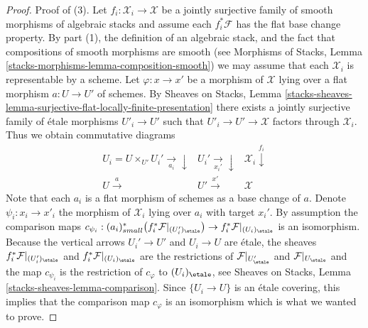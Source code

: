 \begin{proof}
\medskip\noindent
Proof of (3).
Let $f_i : \mathcal{X}_i \to \mathcal{X}$ be a jointly surjective family of
smooth morphisms of algebraic stacks and assume each $f_i^*\mathcal{F}$
has the flat base change property. By part (1), the definition of
an algebraic stack, and the fact that compositions of smooth morphisms
are smooth (see
Morphisms of Stacks, Lemma \ref{stacks-morphisms-lemma-composition-smooth})
we may assume that each $\mathcal{X}_i$ is representable by a scheme.
Let $\varphi : x \to x'$ be a morphism of $\mathcal{X}$ lying over
a flat morphism $a : U \to U'$ of schemes. By
Sheaves on Stacks, Lemma
\ref{stacks-sheaves-lemma-surjective-flat-locally-finite-presentation}
there exists a jointly surjective family of \'etale morphisms
$U'_i \to U'$ such that $U'_i \to U' \to \mathcal{X}$ factors through
$\mathcal{X}_i$. Thus we obtain commutative diagrams
$$
\begin{array}{ccc}U_i = U \times_{U'} U_i' \underset{a_i}{\longrightarrow}\downarrow & U_i' \underset{x_i'}{\longrightarrow}\downarrow & \mathcal{X}_i \overset{f_i}{\downarrow} \\ U \overset{a}{\longrightarrow} & U' \overset{x'}{\longrightarrow} & \mathcal{X}\end{array}
$$
Note that each $a_i$ is a flat morphism of schemes as a base change of $a$.
Denote $\psi_i : x_i \to x'_i$ the morphism of $\mathcal{X}_i$ lying over
$a_i$ with target $x_i'$. By assumption the comparison maps
$c_{\psi_i} :
(a_i)_{small}^*\big(f_i^*\mathcal{F}|_{(U'_i)_\etale}\big)
\to f_i^*\mathcal{F}|_{(U_i)_\etale}$ is an isomorphism.
Because the vertical arrows $U_i' \to U'$ and $U_i \to U$ are \'etale,
the sheaves $f_i^*\mathcal{F}|_{(U_i')_\etale}$ and
$f_i^*\mathcal{F}|_{(U_i)_\etale}$ are the restrictions of
$\mathcal{F}|_{U'_\etale}$ and $\mathcal{F}|_{U_\etale}$
and the map $c_{\psi_i}$ is the restriction of $c_\varphi$ to
$(U_i)_\etale$, see
Sheaves on Stacks, Lemma \ref{stacks-sheaves-lemma-comparison}.
Since $\{U_i \to U\}$ is an \'etale covering, this implies
that the comparison map $c_\varphi$ is an isomorphism which is what
we wanted to prove.


\end{proof}
